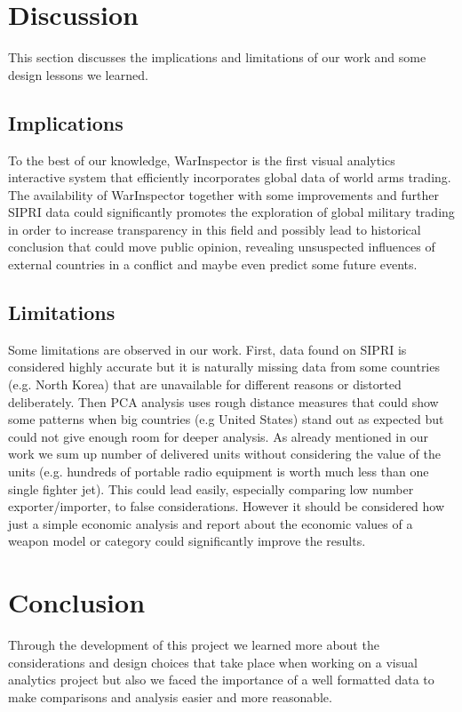 \documentclass{article}
\begin{document}
\begin{multicols}{2}
\section{Discussion}

This section discusses the implications and limitations of our work and some design lessons we learned.
\subsection{Implications}
To the best of our knowledge, WarInspector is the first visual analytics interactive system that efficiently incorporates  global data of world arms trading. The availability of WarInspector together with some improvements and further SIPRI data could significantly promotes the exploration of global military trading in order to increase transparency in this field and possibly lead to historical conclusion that could move public opinion, revealing unsuspected influences of external countries in a conflict and maybe even predict some future events. 

\subsection{Limitations}

Some limitations are observed in our work. First, data found on SIPRI is considered highly accurate but it is naturally missing data from some countries (e.g. North Korea) that are unavailable for different reasons or distorted deliberately. Then PCA analysis uses rough distance measures that could show some patterns when big countries (e.g United States) stand out as expected but could not give enough room for deeper analysis.
As already mentioned in our work we sum up number of delivered units without considering the value of the units (e.g. hundreds of portable radio equipment is worth much less than one single fighter jet). This could lead easily, especially comparing low number exporter/importer, to false considerations. However it should be considered how just a simple economic analysis and report about the economic values of a weapon model or category could significantly improve the results.




\section{Conclusion}
Through the development of this project we learned more about the considerations and design choices that take place when working on a visual analytics project but also we faced the importance of a well formatted data to make comparisons and analysis easier and more reasonable.

\end{multicols}
\end{document}
